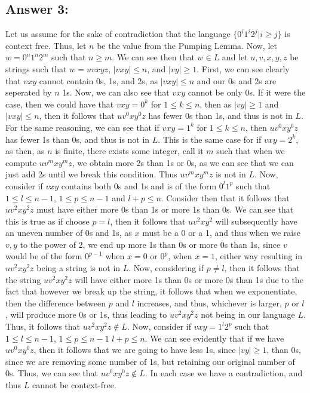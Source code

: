 \documentclass[11pt]{article}
\begin{document}
\subsection*{Answer 3:}
Let us assume for the sake of contradiction that the language $\{0^i1^i2^j | i \geq j\}$ is context free. Thus, let $n$ be the value from the Pumping Lemma. Now, let $w = 0^n1^n2^m$ such that $ n \geq m$. We can see then that $w \in L$ and let $u,v,x,y,z$ be strings such that $w = uvxyz$, $|vxy| \leq n$, and $|vy|\geq 1$. First, we can see clearly that $vxy$ cannot contain 0s, 1s, and 2s, as $|vxy| \leq n$ and our 0s and 2s are seperated by $n$ 1s.
Now, we can also see that $vxy$ cannot be only 0s. If it were the case, then we could have that $vxy=0^k$ for $1\leq k \leq n$, then as  $|vy| \geq 1$ and $|vxy| \leq n$, then it follows that $uv^0xy^0z$ has fewer 0s than 1s, and thus is not in $L$. For the same reasoning, we can see that if $vxy = 1^k$ for $1 \leq k \leq n$, then $uv^0xy^0z$ has fewer 1s than 0s, and thus is not in $L$. This is the same case for if $vxy = 2^k$, as then, as $n$ is finite, there exists some integer, call it $m$ such that when we compute $uv^mxy^mz$, we obtain more 2s than 1s or 0s, as we can see that we can just add 2s until we break this condition. Thus $uv^mxy^mz$ is not in $L$.
Now, consider if $vxy$ contains both 0s and 1s and is of the form $0^l1^p$ such that $1 \leq l \leq n-1$, $1 \leq p \leq n-1$ and $l+p \leq n$. Consider then that it follows that $uv^2xy^2z$ must have either more 0s than 1s or more 1s than 0s. We can see that this is true as if choose $p = l$, then it follows that $uv^2xy^2$ will subsequently have an uneven number of 0s and 1s, as $x$ must be a 0 or a 1, and thus when we raise $v,y$ to the power of 2,
we end up more 1s than 0s or more 0s than 1s, since $v$ would be of the form $0^{p-1}$ when $x = 0$ or $0^{p}$, when $x = 1$, either way resulting in $uv^2xy^2z$ being a string is not in $L$. Now, considering if $p \neq l$, then it follows that the string $uv^2xy^2z$ will have either more 1s than 0s or more 0s than 1s due to the fact that however we break up the string, it follows that when we exponentiate, then the difference between $p$ and $l$ increases, and thus, whichever is larger, $p$ or $l$, will produce more 0s or 1s, thus leading to $uv^2xy^2z$ not being in our language $L$. Thus, it follows that $uv^2xy^2z \not \in L$. Now, consider if $vxy = 1^l2^p$ such that $1 \leq l \leq n-1$, $1 \leq p \leq n-1$ $l + p \leq n$. We can see evidently that if we have $uv^0xy^0z$, then it follows
that we are going to have less 1s, since $|vy| \geq 1$, than 0s, since we are removing some number of 1s, but retaining our original number of 0s. Thus, we can see that $uv^0xy^0z \not \in L$.  In each case we have a contradiction, and thus $L$
cannot be context-free.
\end{document}
